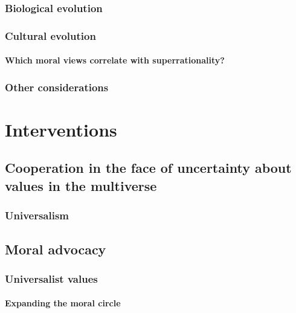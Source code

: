 \documentclass{book}
\begin{document}
\subsection{Biological evolution}
\label{Biological evolution}

\subsection{Cultural evolution}
\label{Cultural evolution}

\subsubsection{Which moral views correlate with superrationality?}
\label{Which moral views correlate with superrationality?}

\subsection{Other considerations}
\label{Other considerations}



\chapter{Interventions}
\label{Interventions}

\section{Cooperation in the face of uncertainty about values in the multiverse}
\label{Cooperation in the face of uncertainty about values in the multiverse}

\subsection{Universalism}
\label{Universalism}

\section{Moral advocacy}
\label{Moral advocacy}

\subsection{Universalist values}
\label{Universalist values}

\subsubsection{Expanding the moral circle}
\label{Expanding the moral circle}
\end{document}
